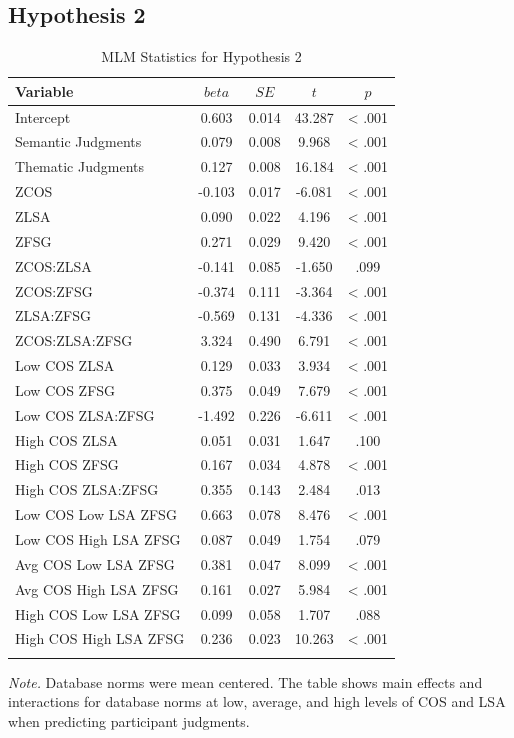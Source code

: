 \documentclass[english,man]{apa6}
\theoremstyle{definition}
\theoremstyle{definition}
\theoremstyle{definition}
\theoremstyle{remark}
\begin{document}
\subsection{Hypothesis 2}\label{hypothesis-2}

\begin{table}[tbp]
\begin{center}
\begin{threeparttable}
\caption{\label{tab:hyp2-table}MLM Statistics for Hypothesis 2}
\small{
\begin{tabular}{lcccc}
\toprule
Variable & \multicolumn{1}{c}{$beta$} & \multicolumn{1}{c}{$SE$} & \multicolumn{1}{c}{$t$} & \multicolumn{1}{c}{$p$}\\
\midrule
Intercept & 0.603 & 0.014 & 43.287 & < .001\\
Semantic Judgments & 0.079 & 0.008 & 9.968 & < .001\\
Thematic Judgments & 0.127 & 0.008 & 16.184 & < .001\\
ZCOS & -0.103 & 0.017 & -6.081 & < .001\\
ZLSA & 0.090 & 0.022 & 4.196 & < .001\\
ZFSG & 0.271 & 0.029 & 9.420 & < .001\\
ZCOS:ZLSA & -0.141 & 0.085 & -1.650 & .099\\
ZCOS:ZFSG & -0.374 & 0.111 & -3.364 & < .001\\
ZLSA:ZFSG & -0.569 & 0.131 & -4.336 & < .001\\
ZCOS:ZLSA:ZFSG & 3.324 & 0.490 & 6.791 & < .001\\
Low COS ZLSA & 0.129 & 0.033 & 3.934 & < .001\\
Low COS ZFSG & 0.375 & 0.049 & 7.679 & < .001\\
Low COS ZLSA:ZFSG & -1.492 & 0.226 & -6.611 & < .001\\
High COS ZLSA & 0.051 & 0.031 & 1.647 & .100\\
High COS ZFSG & 0.167 & 0.034 & 4.878 & < .001\\
High COS ZLSA:ZFSG & 0.355 & 0.143 & 2.484 & .013\\
Low COS Low LSA ZFSG & 0.663 & 0.078 & 8.476 & < .001\\
Low COS High LSA ZFSG & 0.087 & 0.049 & 1.754 & .079\\
Avg COS Low LSA ZFSG & 0.381 & 0.047 & 8.099 & < .001\\
Avg COS High LSA ZFSG & 0.161 & 0.027 & 5.984 & < .001\\
High COS Low LSA ZFSG & 0.099 & 0.058 & 1.707 & .088\\
High COS High LSA ZFSG & 0.236 & 0.023 & 10.263 & < .001\\
\bottomrule
\addlinespace
\end{tabular}
}
\begin{tablenotes}[para]
\textit{Note.} Database norms were mean centered. The table shows main effects and interactions for database norms at low, average, and high levels of COS and LSA when predicting participant judgments.
\end{tablenotes}
\end{threeparttable}
\end{center}
\end{table}
\end{document}
